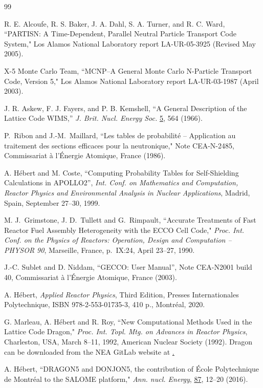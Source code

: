 \documentclass[11pt,twoside]{NJOYMan}
\begin{document}
\begin{thebibliography}{99}
\begin{singlespace}
 R. E. Alcoufe, R. S. Baker, J. A. Dahl, S. A. Turner,
  and R. C. Ward, ``PARTISN: A Time-Dependent, Parallel Neutral Particle
  Transport Code System," Los Alamos National Laboratory report
  LA-UR-05-3925 (Revised May 2005).

 X-5 Monte Carlo Team, ``MCNP--A General Monte Carlo
  N-Particle Transport Code, Version 5," Los Alamos National
  Laboratory report LA-UR-03-1987 (April 2003).

 J. R. Askew, F. J. Fayers, and P. B. Kemshell,
  ``A General Description of the Lattice Code WIMS,''
  {\it J. Brit. Nucl. Energy Soc.} \underline{5}, 564 (1966).

  P.~Ribon and J.-M.~Maillard, ``Les tables de probabilit\'e -- Application
  au traitement des sections efficaces pour la neutronique,"
  Note CEA-N-2485, Commissariat \`a l'\'Energie Atomique, France (1986).

  A. H\'ebert and M. Coste, ``Computing Probability Tables for Self-Shielding
  Calculations in APOLLO2'', {\sl Int. Conf. on Mathematics and Computation,
  Reactor Physics and Environmental Analysis in Nuclear Applications}, Madrid,
  Spain, September 27--30, 1999.

  M. J.~Grimstone, J. D.~Tullett and G.~Rimpault, ``Accurate Treatments of Fast
  Reactor Fuel Assembly Heterogeneity with the ECCO Cell Code," {\sl Proc. Int.
  Conf. on the Physics of Reactors: Operation, Design and Computation -- PHYSOR
  90}, Marseille, France, p.~IX:24, April 23--27, 1990.

  J.-C. Sublet and D. Niddam, ``GECCO: User Manual'', Note CEA-N2001 build 40,
  Commissariat \`a l'\'Energie Atomique, France (2003).

  A. H\'ebert, {\sl Applied Reactor Physics}, Third Edition, Presses Internationales
  Polytechnique, ISBN 978-2-553-01735-3, 410 p., Montr\'eal, 2020.

  G. Marleau, A. H\'ebert and R. Roy, ``New Computational Methods Used
  in the Lattice Code Dragon," {\sl Proc. Int. Topl. Mtg. on Advances in
  Reactor Physics}, Charleston, USA, March 8--11, 1992, American Nuclear
  Society (1992). Dragon can be downloaded from the NEA GitLab website at
  \href{https://git.oecd-nea.org/dragon}.

  A. H\'ebert, ``DRAGON5 and DONJON5, the contribution of \'Ecole
  Polytechnique de Montr\'eal to the SALOME platform,"
  {\sl Ann. nucl. Energy}, \underline{87}, 12--20 (2016).


\end{singlespace}
\end{thebibliography}
\end{document}
